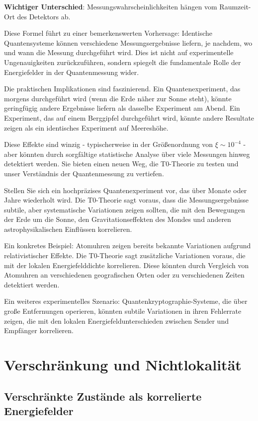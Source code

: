 \documentclass[12pt,a4paper]{article}
\newcommand{\xipar}{\xi}
\theoremstyle{definition}
\theoremstyle{remark}
\begin{document}
\textbf{Wichtiger Unterschied}: Messungswahrscheinlichkeiten hängen vom Raumzeit-Ort des Detektors ab.

Diese Formel führt zu einer bemerkenswerten Vorhersage: Identische Quantensysteme können verschiedene Messungsergebnisse liefern, je nachdem, wo und wann die Messung durchgeführt wird. Dies ist nicht auf experimentelle Ungenauigkeiten zurückzuführen, sondern spiegelt die fundamentale Rolle der Energiefelder in der Quantenmessung wider.

Die praktischen Implikationen sind faszinierend. Ein Quantenexperiment, das morgens durchgeführt wird (wenn die Erde näher zur Sonne steht), könnte geringfügig andere Ergebnisse liefern als dasselbe Experiment am Abend. Ein Experiment, das auf einem Berggipfel durchgeführt wird, könnte andere Resultate zeigen als ein identisches Experiment auf Meereshöhe.

Diese Effekte sind winzig - typischerweise in der Größenordnung von $\xipar \sim 10^{-4}$ - aber könnten durch sorgfältige statistische Analyse über viele Messungen hinweg detektiert werden. Sie bieten einen neuen Weg, die T0-Theorie zu testen und unser Verständnis der Quantenmessung zu vertiefen.

Stellen Sie sich ein hochpräzises Quantenexperiment vor, das über Monate oder Jahre wiederholt wird. Die T0-Theorie sagt voraus, dass die Messungsergebnisse subtile, aber systematische Variationen zeigen sollten, die mit den Bewegungen der Erde um die Sonne, den Gravitationseffekten des Mondes und anderen astrophysikalischen Einflüssen korrelieren.

Ein konkretes Beispiel: Atomuhren zeigen bereits bekannte Variationen aufgrund relativistischer Effekte. Die T0-Theorie sagt zusätzliche Variationen voraus, die mit der lokalen Energiefelddichte korrelieren. Diese könnten durch Vergleich von Atomuhren an verschiedenen geografischen Orten oder zu verschiedenen Zeiten detektiert werden.

Ein weiteres experimentelles Szenario: Quantenkryptographie-Systeme, die über große Entfernungen operieren, könnten subtile Variationen in ihren Fehlerrate zeigen, die mit den lokalen Energiefeldunterschieden zwischen Sender und Empfänger korrelieren.

\section{Verschränkung und Nichtlokalität}

\subsection{Verschränkte Zustände als korrelierte Energiefelder}
\end{document}
